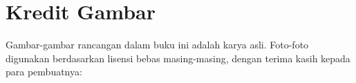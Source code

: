 \chapter*{Kredit Gambar}

\begingroup\sloppy

Gambar-gambar rancangan dalam buku ini adalah karya asli. Foto-foto
digunakan berdasarkan lisensi bebas masing-masing, dengan terima kasih
kepada para pembuatnya:

